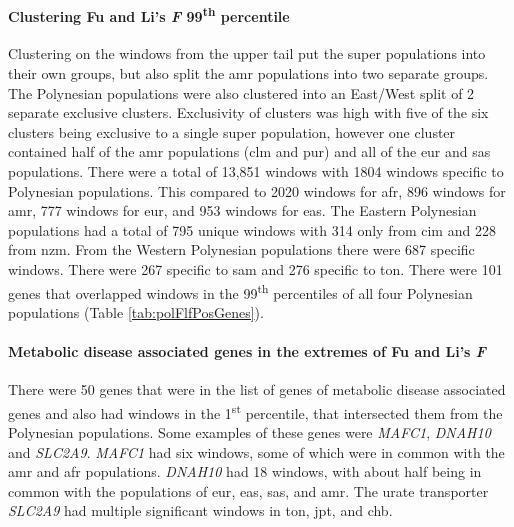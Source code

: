 \documentclass[twoside,openright]{report}
\let\oldparagraph\paragraph
\renewcommand{\paragraph}[1]{\oldparagraph{#1}\mbox{}}
\begin{document}
\paragraph{\texorpdfstring{Clustering Fu and Li's \emph{F}
99\textsuperscript{th}
percentile}{Clustering Fu and Li's F 99th percentile}}\label{clustering-fu-and-lis-f-99th-percentile}

Clustering on the windows from the upper tail put the super populations
into their own groups, but also split the \gls{amr} populations into two
separate groups. The Polynesian populations were also clustered into an
East/West split of 2 separate exclusive clusters. Exclusivity of
clusters was high with five of the six clusters being exclusive to a
single super population, however one cluster contained half of the
\gls{amr} populations (\gls{clm} and \gls{pur}) and all of the \gls{eur}
and \gls{sas} populations. There were a total of 13,851 windows with
1804 windows specific to Polynesian populations. This compared to 2020
windows for \gls{afr}, 896 windows for \gls{amr}, 777 windows for
\gls{eur}, and 953 windows for \gls{eas}. The Eastern Polynesian
populations had a total of 795 unique windows with 314 only from
\gls{cim} and 228 from \gls{nzm}. From the Western Polynesian
populations there were 687 specific windows. There were 267 specific to
\gls{sam} and 276 specific to \gls{ton}. There were 101 genes that
overlapped windows in the 99\textsuperscript{th} percentiles of all four
Polynesian populations (Table \ref{tab:polFlfPosGenes}).

\paragraph{\texorpdfstring{Metabolic disease associated genes in the
extremes of Fu and Li's
\emph{F}}{Metabolic disease associated genes in the extremes of Fu and Li's F}}\label{metabolic-disease-associated-genes-in-the-extremes-of-fu-and-lis-f}

There were 50 genes that were in the list of genes of metabolic disease
associated genes and also had windows in the 1\textsuperscript{st}
percentile, that intersected them from the Polynesian populations. Some
examples of these genes were \emph{MAFC1}, \emph{DNAH10} and
\emph{SLC2A9}. \emph{MAFC1} had six windows, some of which were in
common with the \gls{amr} and \gls{afr} populations. \emph{DNAH10} had
18 windows, with about half being in common with the populations of
\gls{eur}, \gls{eas}, \gls{sas}, and \gls{amr}. The urate transporter
\emph{SLC2A9} had multiple significant windows in \gls{ton}, \gls{jpt},
and \gls{chb}.
\end{document}
